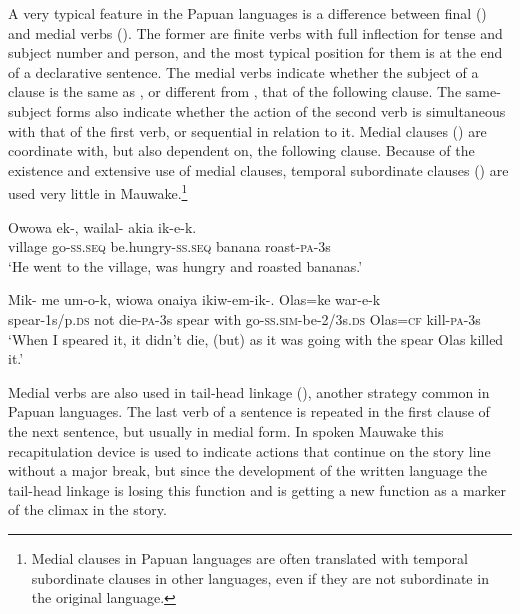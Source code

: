 A very typical feature in the Papuan languages is a difference between final () and medial verbs (). The former are finite verbs with full inflection for tense and subject number and person, and the most typical position for them is at the end of a declarative sentence. The medial verbs indicate whether the subject of a clause is the same as , or different from , that of the following clause. The same-subject forms also indicate whether the action of the second verb is simultaneous with that of the first verb, or sequential  in relation to it. Medial clauses () are coordinate with, but also dependent on, the following clause. Because of the existence and extensive use of medial clauses, temporal subordinate clauses () are used very little in Mauwake.\footnote{Medial clauses in Papuan languages are often translated with temporal subordinate clauses in other languages, even if they are not subordinate in the original language.}

\ea%
\label{ex:1:x662}
\gll Owowa  ek-,  wailal-  akia  ik-e-k. \\
village  go-\textsc{ss.seq} be.hungry-\textsc{ss.seq} banana  roast-\textsc{pa}-3s      \\
\glt `He went to the village, was hungry and roasted bananas.'
\z


 
\ea%
\label{ex:1:x663}
\gll Mik-   me  um-o-k,  wiowa  onaiya  ikiw-em-ik-. Olas=ke  war-e-k\\
spear-1s/p.\textsc{ds}  not  die-\textsc{pa}-3s  spear  with  go-\textsc{ss.sim}-be-2/3s.\textsc{ds} Olas=\textsc{cf}  kill-\textsc{pa}-3s\\
\glt`When I speared it, it didn't die, (but) as it was going with the spear Olas killed it.'
\z


Medial verbs are also used in tail-head linkage (), another strategy common in Papuan languages. The last verb of a sentence is repeated in the first clause of the next sentence, but usually in medial form.  In spoken Mauwake this recapitulation device is used to indicate actions that continue on the story line without a major break, but since the development of the written language the tail-head linkage is losing this function and is getting a new function as a  marker of the climax in the story.

